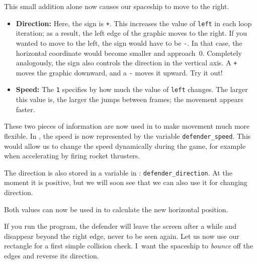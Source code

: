 This small addition alone now causes our spaceship to move to the right. 
\begin{hintbox}
\begin{itemize}
	\item \textbf{Direction:} Here, the sign is \texttt{+}. This increases the value of \texttt{left} in each loop iteration; as a result, the left edge of the graphic moves to the right. If you wanted to move to the left, the sign would have to be	\texttt{-}.	In that case, the horizontal coordinate would become smaller and approach~0. Completely analogously, the sign also controls the direction in the vertical axis. A \texttt{+} moves the graphic downward, and a \texttt{-} moves it upward.	Try it out!
	
	\item \textbf{Speed:}	The \texttt{1} specifies by how much the value of \texttt{left}	changes. The larger this value is, the larger the jumps between frames; the movement appears faster.
\end{itemize}
\end{hintbox}


These two pieces of information are now used in  to make movement much more flexible. In , the speed is now represented by the variable \texttt{defender\_speed}. This would allow us to change the speed dynamically during the game, for example when accelerating by firing rocket thrusters.

The direction is also stored in a variable in : \texttt{defender\_direction}. At the moment it is positive, but we will soon see that we can also use it for changing direction.

Both values can now be used in  to calculate the new horizontal position.

If you run the program, the defender will leave the screen after a while and disappear beyond the right edge, never to be seen again. Let us now use our rectangle for a first simple collision check. I~want the spaceship to \emph{bounce} off the edges and reverse its direction.


